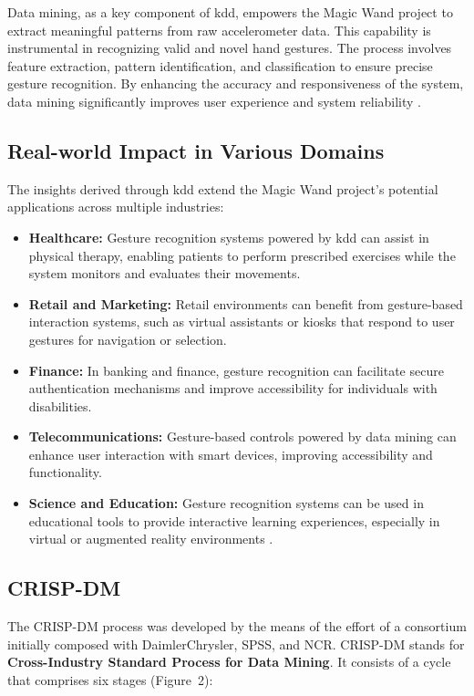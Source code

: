 	Data mining, as a key component of \ac{kdd}, empowers the Magic Wand project to extract meaningful patterns from raw accelerometer data. This capability is instrumental in recognizing valid and novel hand gestures. The process involves feature extraction, pattern identification, and classification to ensure precise gesture recognition. By enhancing the accuracy and responsiveness of the system, data mining significantly improves user experience and system reliability \cite{Fezari:2018}.
	
	\subsection{Real-world Impact in Various Domains}
	
	The insights derived through \ac{kdd} extend the Magic Wand project's potential applications across multiple industries:
	
	\begin{itemize}
		\item \textbf{Healthcare:}  
		Gesture recognition systems powered by \ac{kdd} can assist in physical therapy, enabling patients to perform prescribed exercises while the system monitors and evaluates their movements.
		
		\item \textbf{Retail and Marketing:}  
		Retail environments can benefit from gesture-based interaction systems, such as virtual assistants or kiosks that respond to user gestures for navigation or selection.
		
		\item \textbf{Finance:}  
		In banking and finance, gesture recognition can facilitate secure authentication mechanisms and improve accessibility for individuals with disabilities.
		
		\item \textbf{Telecommunications:}  
		Gesture-based controls powered by data mining can enhance user interaction with smart devices, improving accessibility and functionality.
		
		\item \textbf{Science and Education:}  
		Gesture recognition systems can be used in educational tools to provide interactive learning experiences, especially in virtual or augmented reality environments \cite{Fezari:2018}.
	\end{itemize}
	\subsection{CRISP-DM}
The CRISP-DM process was developed by the means of the effort of a consortium initially composed with DaimlerChrysler, SPSS, and NCR. CRISP-DM stands for \textbf{Cross-Industry Standard Process for Data Mining}. It consists of a cycle that comprises six stages (Figure~2):  

